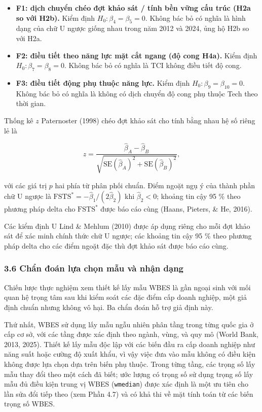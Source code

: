 \documentclass[12pt,a4paper]{article}
\providecommand{\tightlist}{\setlength{\itemsep}{0pt}\setlength{\parskip}{0pt}}
\begin{document}
\begin{itemize}
\tightlist
\item
  \textbf{F1: dịch chuyển chéo đợt khảo sát / tính bền vững cấu trúc
  (H2a so với H2b).} Kiểm định \(H_0: \beta_4 = \beta_5 = 0\). Không bác
  bỏ có nghĩa là hình dạng của chữ U ngược giống nhau trong năm 2012 và
  2024, ủng hộ H2b so với H2a.
\item
  \textbf{F2: điều tiết theo năng lực mặt cắt ngang (độ cong H4a).} Kiểm
  định \(H_0: \beta_7 = \beta_8 = 0\). Không bác bỏ có nghĩa là TCI
  không điều tiết độ cong.
\item
  \textbf{F3: điều tiết động phụ thuộc năng lực.} Kiểm định
  \(H_0: \beta_9 = \beta_{10} = 0\). Không bác bỏ có nghĩa là không có
  dịch chuyển độ cong phụ thuộc Tech theo thời gian.
\end{itemize}

Thống kê \(z\) Paternoster (1998) chéo đợt khảo sát cho tính bằng nhau
hệ số riêng lẻ là

\[
z = \frac{\hat\beta_A - \hat\beta_B}{\sqrt{\mathrm{SE}(\hat\beta_A)^2 + \mathrm{SE}(\hat\beta_B)^2}},
\]

với các giá trị \(p\) hai phía từ phân phối chuẩn. Điểm ngoặt ngụ ý của
thành phần chữ U ngược là
\(\mathrm{FSTS}^{*} = -\hat\beta_1/(2\hat\beta_2)\) khi
\(\hat\beta_2 < 0\); khoảng tin cậy 95 \% theo phương pháp delta cho
\(\mathrm{FSTS}^{*}\) được báo cáo cùng (Haans, Pieters, \& He, 2016).

Các kiểm định U Lind \& Mehlum (2010) được áp dụng riêng cho mỗi đợt
khảo sát để xác minh chính thức chữ U ngược; các khoảng tin cậy 95 \%
theo phương pháp delta cho các điểm ngoặt đặc thù đợt khảo sát được báo
cáo cùng.

\hypertarget{36-chux1ea9n-ux111ouxe1n-lux1ef1a-chux1ecdn-mux1eabu-vuxe0-nhux1eadn-dux1ea1ng}{%
\subsubsection{3.6 Chẩn đoán lựa chọn mẫu và nhận
dạng}\label{36-chux1ea9n-ux111ouxe1n-lux1ef1a-chux1ecdn-mux1eabu-vuxe0-nhux1eadn-dux1ea1ng}}

Chiến lược thực nghiệm xem thiết kế lấy mẫu WBES là gần ngoại sinh với
mối quan hệ trọng tâm sau khi kiểm soát các đặc điểm cấp doanh nghiệp,
một giả định chuẩn nhưng không vô hại. Ba chẩn đoán hỗ trợ giả định này.

Thứ nhất, WBES sử dụng lấy mẫu ngẫu nhiên phân tầng trong từng quốc gia
ở cấp cơ sở, với các tầng được xác định theo ngành, vùng, và quy mô
(World Bank, 2013, 2025). Thiết kế lấy mẫu độc lập với các biến đầu ra
cấp doanh nghiệp như năng suất hoặc cường độ xuất khẩu, vì vậy việc đưa
vào mẫu không có điều kiện không được lựa chọn dựa trên biến phụ thuộc.
Trong từng tầng, các trọng số lấy mẫu thay đổi theo một cách đã biết;
ước lượng có trọng số sử dụng trọng số lấy mẫu đủ điều kiện trung vị
WBES (\texttt{wmedian}) được xác định là một ưu tiên cho lần sửa đổi
tiếp theo (xem Phần 4.7) và có khả thi về mặt tính toán từ các biến
trọng số WBES.
\end{document}
